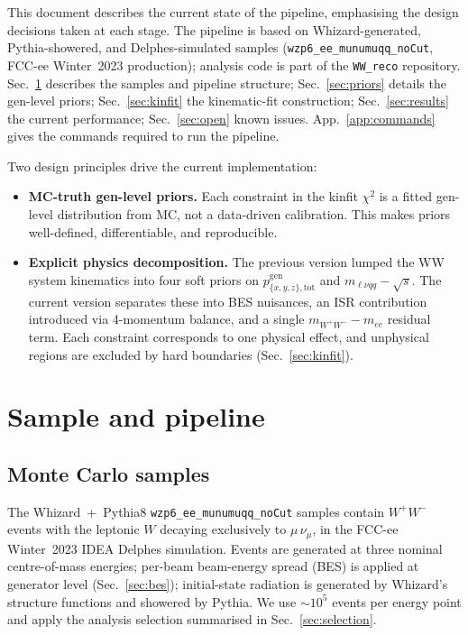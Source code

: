 \documentclass[11pt,a4paper]{article}
\newcommand{\sqs}{\ensuremath{\sqrt{s}}\xspace}
\newcommand{\WW}{\ensuremath{W^+W^-}\xspace}
\newcommand{\codename}[1]{\texttt{\small #1}}
\newcommand{\chitext}{\ensuremath{\chi^2}\xspace}
\begin{document}
This document describes the current state of the pipeline, emphasising
the design decisions taken at each stage. The pipeline is based on
Whizard-generated, Pythia-showered, and Delphes-simulated samples
(\codename{wzp6\_ee\_munumuqq\_noCut}, FCC-ee Winter~2023 production);
analysis code is part of the \codename{WW\_reco} repository.
Sec.~\ref{sec:pipeline} describes the samples and pipeline structure;
Sec.~\ref{sec:priors} details the gen-level priors; Sec.~\ref{sec:kinfit}
the kinematic-fit construction; Sec.~\ref{sec:results} the current
performance; Sec.~\ref{sec:open} known issues. App.~\ref{app:commands}
gives the commands required to run the pipeline.

Two design principles drive the current implementation:
\begin{itemize}[leftmargin=*]
  \item \textbf{MC-truth gen-level priors.} Each constraint in the
        kinfit \chitext is a fitted gen-level distribution from MC, not
        a data-driven calibration. This makes priors well-defined,
        differentiable, and reproducible.
  \item \textbf{Explicit physics decomposition.} The previous version
        lumped the WW system kinematics into four soft priors on
        $p_{\{x,y,z\},\text{tot}}^\text{gen}$ and
        $m_{\ell\nu qq}-\sqs$. The current version separates these into
        BES nuisances, an ISR contribution introduced via 4-momentum
        balance, and a single $m_{\WW}-m_{ee}$ residual term. Each
        constraint corresponds to one physical effect, and unphysical
        regions are excluded by hard boundaries
        (Sec.~\ref{sec:kinfit}).
\end{itemize}


\section{Sample and pipeline}\label{sec:pipeline}

\subsection{Monte Carlo samples}

The Whizard~+~Pythia8 \codename{wzp6\_ee\_munumuqq\_noCut} samples
contain \WW events with the leptonic $W$ decaying exclusively to
$\mu\,\nu_\mu$, in the FCC-ee Winter~2023 IDEA Delphes simulation.
Events are generated at three nominal centre-of-mass energies; per-beam
beam-energy spread (BES) is applied at generator level
(Sec.~\ref{sec:bes}); initial-state radiation is generated by Whizard's
structure functions and showered by Pythia. We use $\sim 10^5$ events
per energy point and apply the analysis selection summarised in
Sec.~\ref{sec:selection}.
\end{document}
